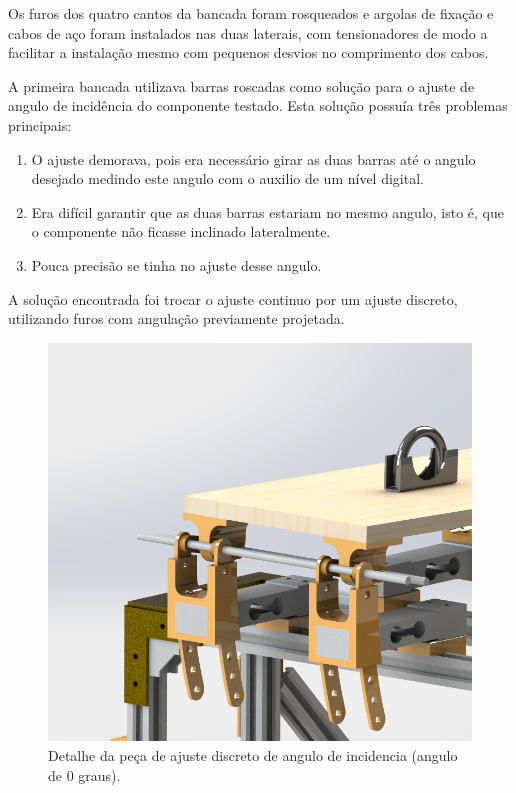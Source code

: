 Os furos dos quatro cantos da bancada foram rosqueados e argolas de fixação e cabos de aço foram instalados nas duas laterais, com tensionadores de modo a facilitar a instalação mesmo com pequenos desvios no comprimento dos cabos.

A primeira bancada utilizava barras roscadas como solução para o ajuste de angulo de incidência do componente testado. Esta solução possuía três problemas principais:

\begin{enumerate}
    \item O ajuste demorava, pois era necessário girar as duas barras até o angulo desejado medindo este angulo com o auxilio de um nível digital.
    \item Era difícil garantir que as duas barras estariam no mesmo angulo, isto é, que o componente não ficasse inclinado lateralmente.
    \item Pouca precisão se tinha no ajuste desse angulo.
\end{enumerate}

A solução encontrada foi trocar o ajuste continuo por um ajuste discreto, utilizando furos com angulação previamente projetada.

\begin{figure}[!ht]
    \centering
    \includegraphics[width=.8\linewidth]{figuras/renders/detalhe_ajuste_angulo_0_graus.png}
    \caption{Detalhe da peça de ajuste discreto de angulo de incidencia (angulo de 0 graus)\cite{autor}.}
    \label{fig:peca_angulo_0}
\end{figure}

